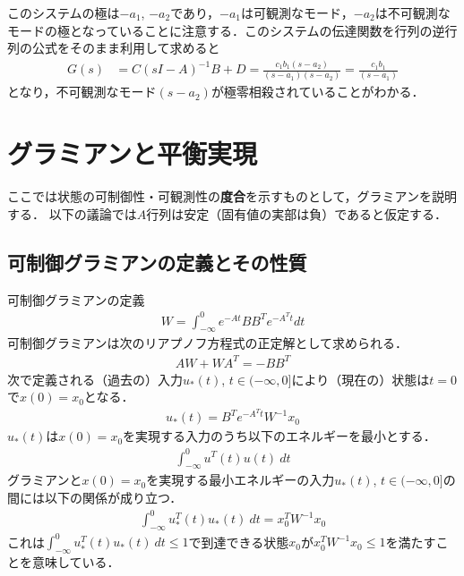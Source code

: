 このシステムの極は$-a_1$, $-a_2$であり，$-a_1$は可観測なモード，$-a_2$は不可観測なモードの極となっていることに注意する．このシステムの伝達関数を行列の逆行列の公式をそのまま利用して求めると
\begin{align}
	G(s) & = C(sI-A)^{-1}B + D
	= 
		\frac{c_1 b_1(s-a_2)}{(s-a_1)(s-a_2)}
	= 
		\frac{c_1 b_1}{(s-a_1)}
\end{align}
となり，不可観測なモード$(s-a_2)$が極零相殺されていることがわかる．




\section{グラミアンと平衡実現}

ここでは状態の可制御性・可観測性の{\bf 度合}を示すものとして，グラミアンを説明する．
以下の議論では$A$行列は安定（固有値の実部は負）であると仮定する．


\subsection{可制御グラミアンの定義とその性質}

\noindent
可制御グラミアンの定義
\begin{align}
	W=\int_{-\infty}^{0} e^{-At} B B^T e^{-A^T t} dt 
\end{align}
可制御グラミアンは次のリアプノフ方程式の正定解として求められる．
\begin{align}
	AW + WA^T = - BB^T
\end{align}
次で定義される（過去の）入力$u_*(t)$, $t\in (-\infty, 0]$により（現在の）状態は$t=0$で$x(0)=x_0$となる．
\begin{align}
	u_{*}(t)= B^T e^{-A^T t} W^{-1} x_0
\end{align}
$u_{*}(t)$は$x(0)=x_0$を実現する入力のうち以下のエネルギーを最小とする．
\begin{align}
	\int_{-\infty}^{0} u^T(t) u(t) \ dt
\end{align}
グラミアンと$x(0)=x_0$を実現する最小エネルギーの入力$u_*(t)$, $t \in (-\infty,0]$の間には以下の関係が成り立つ．
\begin{align}
	\int_{-\infty}^{0} u_*^T(t) u_*(t) \ dt = x_0^{T} W^{-1} x_0
\end{align}
これは$\int_{-\infty}^{0} u_*^T(t) u_*(t) \ dt \leq 1$で到達できる状態$x_0$が$x_0^{T} W^{-1} x_0 \leq 1$を満たすことを意味している．

